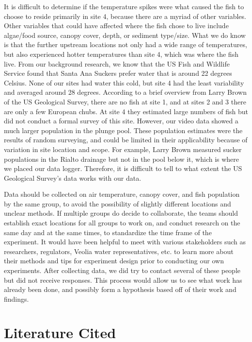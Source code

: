 \documentclass{article}
\begin{document}
It is difficult to determine if the temperature spikes were what caused the fish to choose to reside primarily in site 4, because there are a myriad of other variables. Other variables that could have affected where the fish chose to live include algae/food source, canopy cover, depth, or sediment type/size. What we do know is that the further upstream locations not only had a wide range of temperatures, but also experienced hotter temperatures than site 4, which was where the fish live. From our background research, we know that the US Fish and Wildlife Service found that Santa Ana Suckers prefer water that is around 22 degrees Celsius. None of our sites had water this cold, but site 4 had the least variability and averaged around 28 degrees. According to a brief overview from Larry Brown of the US Geological Survey, there are no fish at site 1, and at sites 2 and 3 there are only a few European chubs. At site 4 they estimated large numbers of fish but did not conduct a formal survey of this site. However, our video data showed a much larger population in the plunge pool. These population estimates were the results of random surveying, and could be limited in their applicability because of variation in site location and scope. For example, Larry Brown measured sucker populations in the Rialto drainage but not in the pool below it, which is where we placed our data logger. Therefore, it is difficult to tell to what extent the US Geological Survey’s data works with our data. 

Data should be collected on air temperature, canopy cover, and fish population by the same group, to avoid the possibility of slightly different locations and unclear methods. If multiple groups do decide to collaborate, the teams should establish exact locations for all groups to work on, and conduct research on the same day and at the same times, to standardize the time frame of the experiment. It would have been helpful to meet with various stakeholders such as researchers, regulators, Veolia water representatives, etc. to learn more about their methods and tips for experiment design prior to conducting our own experiments. After collecting data, we did try to contact several of these people but did not receive responses. This process would allow us to see what work has already been done, and possibly form a hypothesis based off of their work and findings.

\section{Literature Cited}
\end{document}
